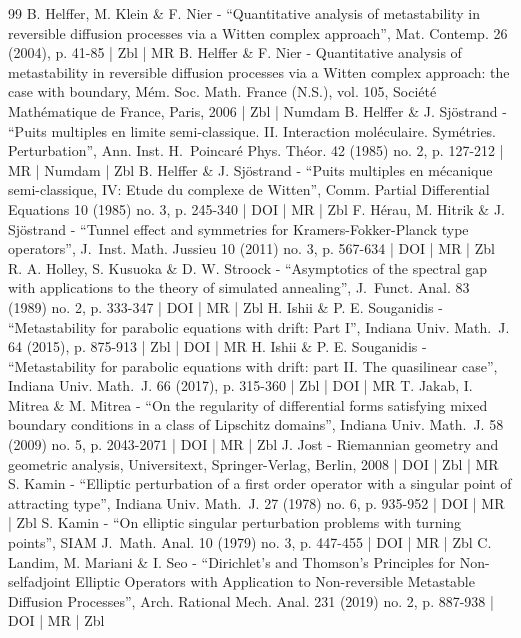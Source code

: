 \begin{thebibliography}{99}
B. Helffer, M. Klein \& F. Nier - “Quantitative analysis of metastability in reversible diffusion processes via a Witten complex approach”, Mat. Contemp. 26 (2004), p. 41-85 | Zbl | MR
B. Helffer \& F. Nier - Quantitative analysis of metastability in reversible diffusion processes via a Witten complex approach: the case with boundary, Mém. Soc. Math. France (N.S.), vol. 105, Société Mathématique de France, Paris, 2006 | Zbl | Numdam
B. Helffer \& J. Sjöstrand - “Puits multiples en limite semi-classique. II. Interaction moléculaire. Symétries. Perturbation”, Ann. Inst. H. Poincaré Phys. Théor. 42 (1985) no. 2, p. 127-212 | MR | Numdam | Zbl
B. Helffer \& J. Sjöstrand - “Puits multiples en mécanique semi-classique, IV: Etude du complexe de Witten”, Comm. Partial Differential Equations 10 (1985) no. 3, p. 245-340 | DOI | MR | Zbl
F. Hérau, M. Hitrik \& J. Sjöstrand - “Tunnel effect and symmetries for Kramers-Fokker-Planck type operators”, J. Inst. Math. Jussieu 10 (2011) no. 3, p. 567-634 | DOI | MR | Zbl
R. A. Holley, S. Kusuoka \& D. W. Stroock - “Asymptotics of the spectral gap with applications to the theory of simulated annealing”, J. Funct. Anal. 83 (1989) no. 2, p. 333-347 | DOI | MR | Zbl
H. Ishii \& P. E. Souganidis - “Metastability for parabolic equations with drift: Part I”, Indiana Univ. Math. J. 64 (2015), p. 875-913 | Zbl | DOI | MR
H. Ishii \& P. E. Souganidis - “Metastability for parabolic equations with drift: part II. The quasilinear case”, Indiana Univ. Math. J. 66 (2017), p. 315-360 | Zbl | DOI | MR
T. Jakab, I. Mitrea \& M. Mitrea - “On the regularity of differential forms satisfying mixed boundary conditions in a class of Lipschitz domains”, Indiana Univ. Math. J. 58 (2009) no. 5, p. 2043-2071 | DOI | MR | Zbl
J. Jost - Riemannian geometry and geometric analysis, Universitext, Springer-Verlag, Berlin, 2008 | DOI | Zbl | MR
S. Kamin - “Elliptic perturbation of a first order operator with a singular point of attracting type”, Indiana Univ. Math. J. 27 (1978) no. 6, p. 935-952 | DOI | MR | Zbl
S. Kamin - “On elliptic singular perturbation problems with turning points”, SIAM J. Math. Anal. 10 (1979) no. 3, p. 447-455 | DOI | MR | Zbl
C. Landim, M. Mariani \& I. Seo - “Dirichlet’s and Thomson’s Principles for Non-selfadjoint Elliptic Operators with Application to Non-reversible Metastable Diffusion Processes”, Arch. Rational Mech. Anal. 231 (2019) no. 2, p. 887-938 | DOI | MR | Zbl

\end{thebibliography}
